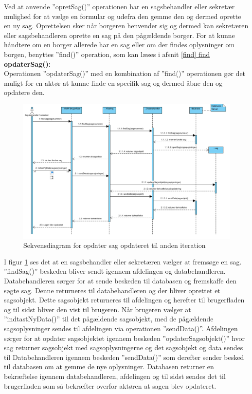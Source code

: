 Ved at anvende ”opretSag()” operationen har en sagsbehandler eller sekretær mulighed for at vælge en formular og udefra den gemme den og dermed oprette en ny sag. Oprettelsen sker når borgeren henvender sig og dermed kan sekretæren eller sagsbehandleren oprette en sag på den pågældende borger. For at kunne håndtere om en borger allerede har en sag eller om der findes oplysninger om borgen, benyttes ”find()” operation, som kan læses i afsnit \underline{\ref{find} find}\\
\textbf{opdaterSag():} \label{opdaterSag}\\
Operationen ”opdaterSag()” med en kombination af ”find()” operationen gør det muligt for en aktør at kunne finde en specifik sag og dermed åbne den og opdatere den. \\
\begin{figure}[htb!]
  \includegraphics[scale = 0.62]{./PNG/analyse/opdaterSag.PNG} 
  \caption{Sekvensdiagram for opdater sag opdateret til anden iteration}
  \label{fig:2opdater}
\end{figure}
I figur \ref{fig:2opdater} ses det at en sagsbehandler eller sekretæren vælger at fremsøge en sag. ”findSag()” beskeden bliver sendt igennem afdelingen og databehandleren. Databehandleren sørger for at sende beskeden til databasen og fremskaffe den søgte sag. Denne returneres til databehandleren og der bliver oprettet et sagsobjekt. Dette sagsobjekt returneres til afdelingen og herefter til brugerfladen og til sidst bliver den vist til brugeren. Når brugeren vælger at ”indtastNyData()” til det pågældende sagsobjekt, med de pågældende sagsoplysninger sendes til afdelingen via operationen ”sendData()”. Afdelingen sørger for at opdater sagsobjektet igennem beskeden ”opdaterSagsobjekt()” hvor sag returner sagsobjekt med sagsoplysningerne og det sagsobjekt og data sendes til Databehandleren igennem beskeden ”sendData()” som derefter sender besked til databasen om at gemme de nye oplysninger. Databasen returner en bekræftelse igennem databehandleren, afdelingen og til sidst sendes det til brugerfladen som så bekræfter overfor aktøren at sagen blev opdateret. \\

